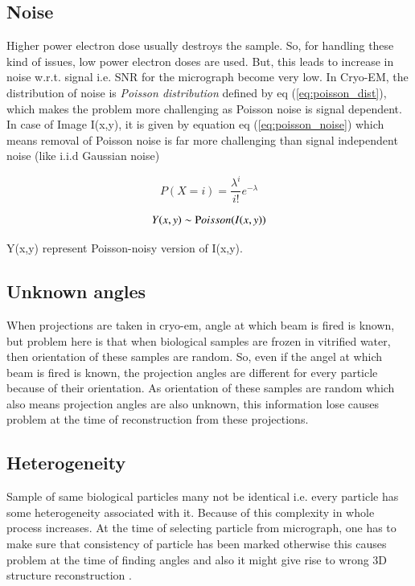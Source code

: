 \documentclass[twoside]{iitbreport}
\begin{document}
\subsection{Noise}
Higher power electron dose usually destroys the sample. So, for handling these kind of issues, low power electron doses are used. But, this leads to increase in noise w.r.t. signal i.e. SNR for the micrograph become very low. In Cryo-EM, the distribution of noise is \textit{Poisson distribution} defined by eq (\ref{eq:poisson_dist}), which makes the problem more challenging as Poisson noise is signal dependent. In case of Image I(x,y), it is given by equation eq (\ref{eq:poisson_noise}) which means removal of Poisson noise is far more challenging than signal independent noise (like i.i.d Gaussian noise)  

\begin{equation}\label{eq:poisson_dist}
    P(X=i) = \frac{\lambda^i}{i!} e^{-\lambda}
\end{equation}

\begin{equation}\label{eq:poisson_noise}
    \begin{aligned}
        Y(x,y) &  \sim \textrm Poisson(I(x,y))\\
    \end{aligned}
\end{equation}

Y(x,y) represent Poisson-noisy version of I(x,y).\\

\subsection{Unknown angles}
When projections are taken in cryo-em, angle at which beam is fired is known, but problem here is that when biological samples are frozen in vitrified water, then orientation of these samples are random. So, even if the angel at which beam is fired is known, the projection angles are different for every particle because of their orientation. As orientation of these samples are random which also means projection angles are also unknown, this information lose causes problem at the time of reconstruction from these projections.

\subsection{Heterogeneity}
Sample of same biological particles many not be identical i.e. every particle has some heterogeneity associated with it. Because of this complexity in whole process increases. At the time of selecting particle from micrograph, one has to make sure that consistency of particle has been marked otherwise this causes problem at the time of finding angles and also it might give rise to wrong 3D structure reconstruction \cite{sigworth2016principles}.
\end{document}
